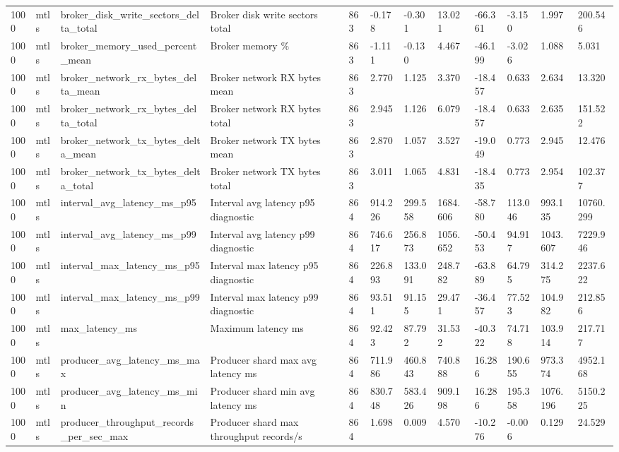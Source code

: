 \begin{longtable}{llllllllllll}
1000 & mtls & broker\_disk\_write\_sectors\_delta\_total & Broker disk write sectors total & 863 & -0.178 & -0.301 & 13.021 & -66.361 & -3.150 & 1.997 & 200.546 \\
1000 & mtls & broker\_memory\_used\_percent\_mean & Broker memory \% & 863 & -1.111 & -0.130 & 4.467 & -46.199 & -3.026 & 1.088 & 5.031 \\
1000 & mtls & broker\_network\_rx\_bytes\_delta\_mean & Broker network RX bytes mean & 863 & 2.770 & 1.125 & 3.370 & -18.457 & 0.633 & 2.634 & 13.320 \\
1000 & mtls & broker\_network\_rx\_bytes\_delta\_total & Broker network RX bytes total & 863 & 2.945 & 1.126 & 6.079 & -18.457 & 0.633 & 2.635 & 151.522 \\
1000 & mtls & broker\_network\_tx\_bytes\_delta\_mean & Broker network TX bytes mean & 863 & 2.870 & 1.057 & 3.527 & -19.049 & 0.773 & 2.945 & 12.476 \\
1000 & mtls & broker\_network\_tx\_bytes\_delta\_total & Broker network TX bytes total & 863 & 3.011 & 1.065 & 4.831 & -18.435 & 0.773 & 2.954 & 102.377 \\
1000 & mtls & interval\_avg\_latency\_ms\_p95 & Interval avg latency p95 diagnostic & 864 & 914.226 & 299.558 & 1684.606 & -58.780 & 113.046 & 993.135 & 10760.299 \\
1000 & mtls & interval\_avg\_latency\_ms\_p99 & Interval avg latency p99 diagnostic & 864 & 746.617 & 256.873 & 1056.652 & -50.453 & 94.917 & 1043.607 & 7229.946 \\
1000 & mtls & interval\_max\_latency\_ms\_p95 & Interval max latency p95 diagnostic & 864 & 226.893 & 133.091 & 248.782 & -63.889 & 64.795 & 314.275 & 2237.622 \\
1000 & mtls & interval\_max\_latency\_ms\_p99 & Interval max latency p99 diagnostic & 864 & 93.511 & 91.155 & 29.471 & -36.457 & 77.523 & 104.982 & 212.856 \\
1000 & mtls & max\_latency\_ms & Maximum latency ms & 864 & 92.423 & 87.792 & 31.532 & -40.322 & 74.718 & 103.914 & 217.717 \\
1000 & mtls & producer\_avg\_latency\_ms\_max & Producer shard max avg latency ms & 864 & 711.986 & 460.843 & 740.888 & 16.286 & 190.655 & 973.374 & 4952.168 \\
1000 & mtls & producer\_avg\_latency\_ms\_min & Producer shard min avg latency ms & 864 & 830.748 & 583.426 & 909.198 & 16.286 & 195.358 & 1076.196 & 5150.225 \\
1000 & mtls & producer\_throughput\_records\_per\_sec\_max & Producer shard max throughput records/s & 864 & 1.698 & 0.009 & 4.570 & -10.276 & -0.006 & 0.129 & 24.529 \\

\end{longtable}

